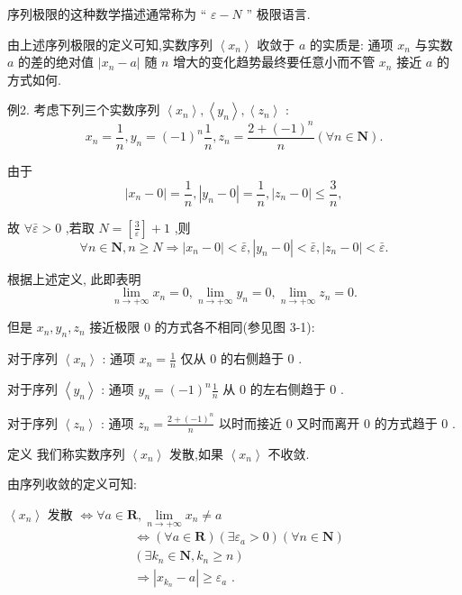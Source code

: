 序列极限的这种数学描述通常称为 “ $\varepsilon  - N$ ” 极限语言.

由上述序列极限的定义可知,实数序列 $\left\langle  {x}_{n}\right\rangle$ 收敛于 $a$ 的实质是: 通项 ${x}_{n}$ 与实数 $a$ 的差的绝对值 $\left| {{x}_{n} - a}\right|$ 随 $n$ 增大的变化趋势最终要任意小而不管 ${x}_{n}$ 接近 $a$ 的方式如何.

例2. 考虑下列三个实数序列 $\left\langle  {x}_{n}\right\rangle  ,\left\langle  {y}_{n}\right\rangle  ,\left\langle  {z}_{n}\right\rangle$ :
$${x}_{n} = \frac{1}{n},{y}_{n} = {\left( -1\right) }^{n}\frac{1}{n},{z}_{n} = \frac{2 + {\left( -1\right) }^{n}}{n}\left( {\forall n \in  \mathbf{N}}\right) .$$

由于
$$\left| {{x}_{n} - 0}\right|  = \frac{1}{n},\left| {{y}_{n} - 0}\right|  = \frac{1}{n},\left| {{z}_{n} - 0}\right|  \leq  \frac{3}{n},$$

故 $\forall \bar{\varepsilon } > 0$ ,若取 $N = \left\lbrack  \frac{3}{\varepsilon }\right\rbrack   + 1$ ,则
$$\forall n \in  \mathbf{N},n \geq  N \Rightarrow  \left| {{x}_{n} - 0}\right|  < \bar{\varepsilon },\left| {{y}_{n} - 0}\right|  < \bar{\varepsilon },\left| {{z}_{n} - 0}\right|  < \bar{\varepsilon }.$$

根据上述定义, 此即表明
$$\mathop{\lim }\limits_{{n \rightarrow   + \infty }}{x}_{n} = 0,\mathop{\lim }\limits_{{n \rightarrow   + \infty }}{y}_{n} = 0,\mathop{\lim }\limits_{{n \rightarrow   + \infty }}{z}_{n} = 0.$$

但是 ${x}_{n},{y}_{n},{z}_{n}$ 接近极限 0 的方式各不相同(参见图 3-1):

对于序列 $\left\langle  {x}_{n}\right\rangle$ : 通项 ${x}_{n} = \frac{1}{n}$ 仅从 0 的右侧趋于 0 .

对于序列 $\left\langle  {y}_{n}\right\rangle$ : 通项 ${y}_{n} = {\left( -1\right) }^{n}\frac{1}{n}$ 从 0 的左右侧趋于 0 .

对于序列 $\left\langle  {z}_{n}\right\rangle$ : 通项 ${z}_{n} = \frac{2 + {\left( -1\right) }^{n}}{n}$ 以时而接近 0 又时而离开 0 的方式趋于 0 .

定义 我们称实数序列 $\left\langle  {x}_{n}\right\rangle$ 发散,如果 $\left\langle  {x}_{n}\right\rangle$ 不收敛.

由序列收敛的定义可知:

$\left\langle  {x}_{n}\right\rangle$ 发散 $\Leftrightarrow  \forall a \in  \mathbf{R},\mathop{\lim }\limits_{{n \rightarrow   + \infty }}{x}_{n} \neq  a$
\begin{align*}
	&\Leftrightarrow  \left( {\forall a \in  \mathbf{R}}\right) \left( {\exists {\varepsilon }_{a} > 0}\right) \left( {\forall n \in  \mathbf{N}}\right)\\
	&\left( {\exists {k}_{n} \in  \mathbf{N},{k}_{n} \geq  n}\right)\\
	&\Rightarrow  \left| {{x}_{{k}_{n}} - a}\right|  \geq  {\varepsilon }_{a}\text{ . }
\end{align*}


